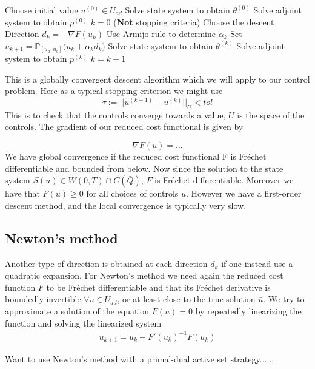 \begin{codebox}
\li Choose initial value $u^{(0)}\in U_{ad}$
\li Solve state system to obtain $\theta^{(0)}$
\li Solve adjoint system to obtain $p^{(0)}$
\li $k=0$
\li \While (\textbf{Not} stopping criteria) \Then
\li Choose the descent Direction $d_k = -\nabla F(u_k)$
\li Use Armijo rule to determine $\alpha_k$
\li Set $u_{k+1} = \mathbb{P}_{[u_a,u_b]}\bigg (u_k + \alpha_k d_k \bigg )$
\li Solve state system to obtain $\theta^{(k)}$
\li Solve adjoint system to obtain $p^{(k)}$
\li $k = k +1$
\end{codebox}
This is a globally convergent descent algorithm which we will apply to our control problem. Here as a typical stopping criterion we might use 
\begin{equation}
    \label{eq:stopping}
    \tau := ||u^{(k+1)} - u^{(k)}||_U < tol
\end{equation}
This is to check that the controls converge towards a value, $U$ is the space of the controls. The gradient of our reduced cost functional is given by

\begin{equation*}
    \nabla F(u) = ...
\end{equation*}
We have global convergence if the reduced cost functional F is Fréchet differentiable and bounded from below. Now since the solution to the state system $S(u) \in W(0,T) \cap C(\bar{Q})$, $F$ is Fréchet differentiable. Moreover we have that $F(u) \geq 0$ for all choices of controls $u$. However we have a first-order descent method, and the local convergence is typically very slow. 

\subsection{Newton's method}
Another type of direction is obtained at each direction $d_k$ if one instead use a quadratic expansion. For Newton's method we need again the reduced cost function $F$ to be Fréchet differentiable and that its Fréchet derivative is boundedly invertible $\forall u \in U_{ad}$, or at least close to the true solution $\bar{u}$. We try to approximate a solution of the equation $F(u) = 0$ by repeatedly linearizing the function and solving the linearized system
\begin{align}
    \label{eq:Newton}
    u_{k+1} = u_k - F'(u_k)^{-1}F(u_k)
\end{align}


Want to use Newton's method with a primal-dual active set strategy...... 



